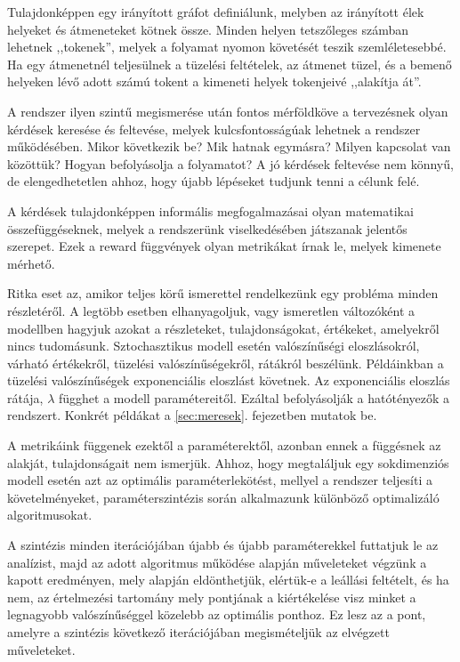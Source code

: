 Tulajdonképpen egy irányított gráfot definiálunk, melyben az irányított élek helyeket és átmeneteket kötnek össze. Minden helyen tetszőleges számban lehetnek ,,tokenek'', melyek a folyamat nyomon követését teszik szemléletesebbé. Ha egy átmenetnél teljesülnek a tüzelési feltételek, az átmenet tüzel, és a bemenő helyeken lévő adott számú tokent a kimeneti helyek tokenjeivé ,,alakítja át''.

A rendszer ilyen szintű megismerése után fontos mérföldköve a tervezésnek olyan kérdések keresése és feltevése, melyek kulcsfontosságúak lehetnek a rendszer működésében. Mikor következik be? Mik hatnak egymásra? Milyen kapcsolat van közöttük? Hogyan befolyásolja a folyamatot? A jó kérdések feltevése nem könnyű, de elengedhetetlen ahhoz, hogy újabb lépéseket tudjunk tenni a célunk felé.

A kérdések tulajdonképpen informális megfogalmazásai olyan matematikai összefüggéseknek, melyek a rendszerünk viselkedésében játszanak jelentős szerepet. Ezek a reward függvények olyan metrikákat írnak le, melyek kimenete mérhető. 

Ritka eset az, amikor teljes körű ismerettel rendelkezünk egy probléma minden részletéről. A legtöbb esetben elhanyagoljuk, vagy ismeretlen változóként a modellben hagyjuk azokat a részleteket, tulajdonságokat, értékeket, amelyekről nincs tudomásunk. 
Sztochasztikus modell esetén valószínűségi eloszlásokról, várható értékekről, tüzelési valószínűségekről, rátákról beszélünk. Példáinkban a tüzelési valószínűségek exponenciális eloszlást követnek. Az exponenciális eloszlás rátája, $\lambda$
függhet a modell paramétereitől. Ezáltal befolyásolják a hatótényezők a rendszert. Konkrét példákat a \ref{sec:meresek}. fejezetben mutatok be.

A metrikáink függenek ezektől a paraméterektől, azonban ennek a függésnek az alakját, tulajdonságait nem ismerjük. Ahhoz, hogy megtaláljuk egy sokdimenziós modell esetén azt az optimális paraméterlekötést, mellyel a rendszer teljesíti a követelményeket, paraméterszintézis során alkalmazunk különböző optimalizáló algoritmusokat.

A szintézis minden iterációjában újabb és újabb paraméterekkel futtatjuk le az analízist, majd az adott algoritmus működése alapján műveleteket végzünk a kapott eredményen, mely alapján eldönthetjük, elértük-e a leállási feltételt, és ha nem, az értelmezési tartomány mely pontjának a kiértékelése visz minket a legnagyobb valószínűséggel közelebb az optimális ponthoz. Ez lesz az a pont, amelyre a szintézis következő iterációjában megismételjük az elvégzett műveleteket.

